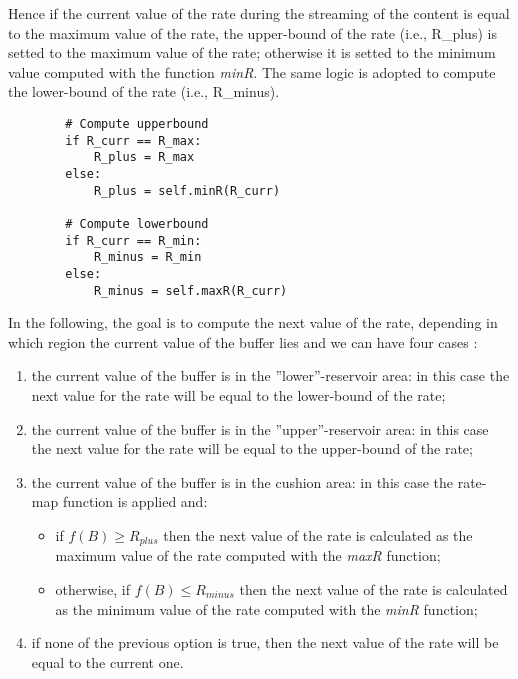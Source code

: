 \documentclass[a4paper]{report}
\begin{document}
Hence if the current value of the rate during the streaming of the content is equal to the maximum value of the rate, the upper-bound of the rate (i.e., R\_plus) is setted to the maximum value of the rate; otherwise it is setted to the minimum value computed with the function \textit{minR}.
The same logic is adopted to compute the lower-bound of the rate (i.e., R\_minus).
\begin{Verbatim}
        # Compute upperbound
        if R_curr == R_max:
            R_plus = R_max
        else:
            R_plus = self.minR(R_curr)

        # Compute lowerbound
        if R_curr == R_min:
            R_minus = R_min
        else:
            R_minus = self.maxR(R_curr)
\end{Verbatim}

In the following, the goal is to compute the next value of the rate, depending in which region the current value of the buffer lies and we can have four cases :
\begin{enumerate}
\item the current value of the buffer is in the ''lower''-reservoir area: in this case the next value for the rate will be equal to the lower-bound of the rate;

\item the current value of the buffer is in the ''upper''-reservoir area: in this case the next value for the rate will be equal to the upper-bound of the rate;

\item the current value of the buffer is in the cushion area: in this case the rate-map function is applied and:
\begin{itemize}
\item if $f(B) \geq R_{plus}$ then the next value of the rate is calculated as the maximum value of the rate computed with the \textit{maxR} function;
\item otherwise, if $f(B) \leq R_{minus}$ then the next value of the rate is calculated as the minimum value of the rate computed with the \textit{minR} function;
\end{itemize}

\item if none of the previous option is true, then the next value of the rate will be equal to the current one.
\end{enumerate}
\end{document}
